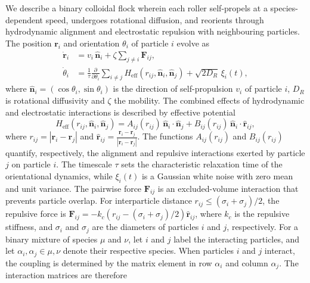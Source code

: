 \documentclass[aps,pre,twocolumn,amsmath,amssymb,notitlepage,superscriptaddress,longbibliography,nofootinbib,10pt]{revtex4-1}
\begin{document}
 We describe a binary colloidal flock wherein each roller self-propels at a species-dependent speed, undergoes rotational diffusion, and reorients through hydrodynamic alignment and electrostatic repulsion with neighbouring particles. The position $\mathbf{r}_i$ and orientation $\theta_i$ of particle $i$ evolve as
\begin{align}
    \dot{\mathbf{r}}_i
    &= v_i\,\hat{\mathbf{n}}_i +  \zeta \sum_{j \neq i} \mathbf{F}_{ij},
    \label{eq:translational_dynamics}
    \\
   \dot{\theta}_i
    &= \frac{1}{\tau}
    \frac{\partial}{\partial\theta_i}
    \sum_{i\neq j}H_{\mathrm{eff}}\left(r_{ij},\hat{\mathbf{n}}_i,\hat{\mathbf{n}}_j\right)
    +\sqrt{2D_R}\,\xi_i(t),
    \label{eq:orientational_dynamics}
\end{align}
where $\hat{\mathbf{n}}_i=(\cos\theta_i,\sin\theta_i)$ is the direction of self-propulsion $v_i$ of particle $i$, $D_R$ is rotational diffusivity and $\zeta$ the mobility.
The combined effects of hydrodynamic and electrostatic interactions is described by effective potential 
\begin{equation}
H_{\mathrm{eff}}\left(r_{ij},\hat{\mathbf{n}}_i,\hat{\mathbf{n}}_j\right)
=
A_{ij}(r_{ij})\,
\hat{\mathbf{n}}_i\cdot\hat{\mathbf{n}}_j
+
B_{ij}(r_{ij})\,
\hat{\mathbf{n}}_i\cdot\hat{\mathbf{r}}_{ij},
\end{equation}
where $r_{ij}=|\mathbf{r}_i-\mathbf{r}_j|$ and $\hat{\mathbf{r}}_{ij}=\frac{\mathbf{r}_i-\mathbf{r}_j}{|\mathbf{r}_i-\mathbf{r}_j|}$. The functions $A_{ij}(r_{ij})$ and $B_{ij}(r_{ij})$ quantify, respectively, the alignment and repulsive interactions exerted by particle $j$ on particle $i$. The timescale $\tau$ sets the characteristic relaxation time of the orientational dynamics, while $\xi_i(t)$ is a Gaussian white noise with zero mean and unit variance.
The pairwise force $\mathbf{F}_{ij}$ is an excluded-volume interaction that prevents particle overlap. For interparticle distance $r_{ij}\leq (\sigma_i + \sigma_j)/2$, the repulsive force is $\mathbf{F}_{ij}=-k_c(r_{ij}-(\sigma_i + \sigma_j)/2)\hat{\mathbf{r}}_{ij}$, where $k_c$ is the repulsive stiffness, and $\sigma_i$ and $\sigma_j$ are the diameters of particles $i$ and $j$, respectively.
For a binary mixture of species $\mu$ and $\nu$, let $i$ and $j$ label the interacting particles, and let $\alpha_i,\alpha_j\in{\mu,\nu}$ denote their respective species. When particles $i$ and $j$ interact, the coupling is determined by the matrix element in row $\alpha_i$ and column $\alpha_j$. The interaction matrices are therefore
\end{document}
